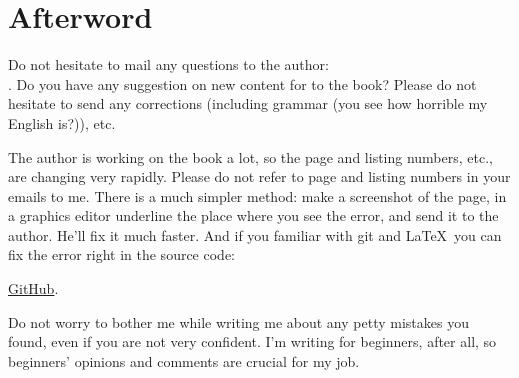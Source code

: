 \part*{Afterword}


Do not hesitate to mail any questions to the author: \\
\GTT{\EMAILS}.
Do you have any suggestion on new content for to the book?
Please do not hesitate to send any corrections (including grammar (you see how horrible my English is?)), etc.

The author is working on the book a lot, so the page and listing numbers, etc., are changing very rapidly.
Please do not refer to page and listing numbers in your emails to me.
There is a much simpler method: make a screenshot of the page, in a graphics editor underline the place where you see the error,
and send it to the author. He'll fix it much faster.
And if you familiar with git and \LaTeX\, you can fix the error right in the source code: 

\href{http://go.yurichev.com/17089}{GitHub}.

Do not worry to bother me while writing me about any petty mistakes you found, even if you are not very confident.
I'm writing for beginners, after all, so beginners' opinions and comments are crucial for my job.

